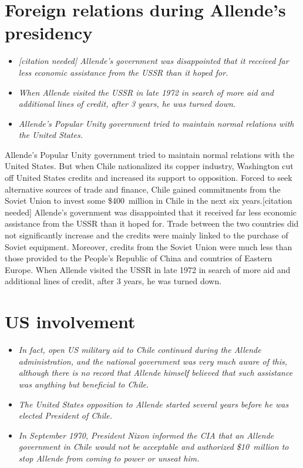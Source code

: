 \section{Foreign relations during Allende's
presidency}\label{foreign-relations-during-allendes-presidency}

\begin{itemize}
\item
  \emph{{[}citation needed{]} Allende's government was disappointed that
  it received far less economic assistance from the USSR than it hoped
  for.}
\item
  \emph{When Allende visited the USSR in late 1972 in search of more aid
  and additional lines of credit, after 3 years, he was turned down.}
\item
  \emph{Allende's Popular Unity government tried to maintain normal
  relations with the United States.}
\end{itemize}

Allende's Popular Unity government tried to maintain normal relations
with the United States. But when Chile nationalized its copper industry,
Washington cut off United States credits and increased its support to
opposition. Forced to seek alternative sources of trade and finance,
Chile gained commitments from the Soviet Union to invest some
\$400~million in Chile in the next six years.{[}citation needed{]}
Allende's government was disappointed that it received far less economic
assistance from the USSR than it hoped for. Trade between the two
countries did not significantly increase and the credits were mainly
linked to the purchase of Soviet equipment. Moreover, credits from the
Soviet Union were much less than those provided to the People's Republic
of China and countries of Eastern Europe. When Allende visited the USSR
in late 1972 in search of more aid and additional lines of credit, after
3 years, he was turned down.

\section{US involvement}\label{us-involvement}

\begin{itemize}
\item
  \emph{In fact, open US military aid to Chile continued during the
  Allende administration, and the national government was very much
  aware of this, although there is no record that Allende himself
  believed that such assistance was anything but beneficial to Chile.}
\item
  \emph{The United States opposition to Allende started several years
  before he was elected President of Chile.}
\item
  \emph{In September 1970, President Nixon informed the CIA that an
  Allende government in Chile would not be acceptable and authorized
  \$10~million to stop Allende from coming to power or unseat him.}
\end{itemize}

